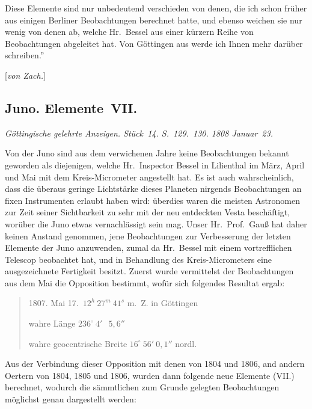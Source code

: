 \documentclass[12pt,a4paper]{book}
\begin{document}
Diese Elemente sind nur unbedeutend verschieden von denen, die ich schon fr\"uher aus einigen Berliner Beobachtungen berechnet hatte, und ebenso weichen sie nur wenig von denen ab, welche Hr.~Bessel aus einer k\"urzern Reihe von Beobachtungen abgeleitet hat. Von G\"ottingen aus werde ich Ihnen mehr dar\"uber schreiben.''

[\textit{von Zach.}]


\newpage
\subsection*{Juno. Elemente~VII.}

\textit{G\"ottingische gelehrte Anzeigen. St\"uck~14. S.~129.~130. 1808 Januar~23.}

Von der Juno sind aus dem verwichenen Jahre keine Beobachtungen bekannt geworden als diejenigen, welche Hr.~Inspector Bessel in Lilienthal im M\"arz, April und Mai mit dem Kreis-Micrometer angestellt hat. Es ist auch wahrscheinlich, dass die \"uberaus geringe Lichtst\"arke dieses Planeten nirgends Beobachtungen an fixen Instrumenten erlaubt haben wird: \"uberdies waren die meisten Astronomen zur Zeit seiner Sichtbarkeit zu sehr mit der neu entdeckten Vesta besch\"aftigt, wor\"uber die Juno etwas vernachl\"assigt sein mag. Unser Hr.~Prof.~Gau{\ss} hat daher keinen Anstand genommen, jene Beobachtungen zur Verbesserung der letzten Elemente der Juno anzuwenden, zumal da Hr.~Bessel mit einem vortrefflichen Telescop beobachtet hat, und in Behandlung des Kreis-Micrometers eine ausgezeichnete Fertigkeit besitzt. Zuerst wurde vermittelst der Beobachtungen aus dem Mai die Opposition bestimmt, wof\"ur sich folgendes Resultat ergab:

\begin{quote}
1807. Mai 17.\ $12^{h}\ 27^{m}\ 41^{s}$ m.~Z. in G\"ottingen

wahre L\"ange \dotfill $236^{\circ}\ 4'\ \phantom{0}5{,}6''$

wahre geocentrische Breite \dotfill $16^{\circ}\ 56'\ 0{,}1''$ nordl.
\end{quote}

Aus der Verbindung dieser Opposition mit denen von 1804 und 1806, and andern Oertern von 1804, 1805 und 1806, wurden dann folgende neue Elemente (VII.) berechnet, wodurch die s\"ammtlichen zum Grunde gelegten Beobachtungen m\"oglichst genau dargestellt werden:
\end{document}
